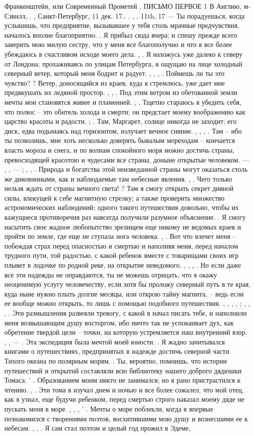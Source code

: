 Франкенштейн, или Современный Прометей , ПИСЬМО ПЕРВОЕ 1 В Англию, м- Сзвилл, . , Санкт-Петербург, 11 дек. 17.. . , . 11th, 17 — Ты порадуешься, когда услышишь, что предприятие, вызывавшее у тебя столь мрачные предчувствия, началось вполне благоприятно. . Я прибыл сюда вчера; и спешу прежде всего заверить мою милую сестру, что у меня все благополучно и что я все более убеждаюсь в счастливом исходе моего дела. , . Я нахожусь уже далеко к северу от Лондона; прохаживаясь по улицам Петербурга, я ощущаю на лице холодный северный ветер, который меня бодрит и радует. , , , . Поймешь ли ты это чувство? ? Ветер, доносящийся из краев, куда я стремлюсь, уже дает мне предвкушать их ледяной простор. , , . Под этим ветром из обетованной земли мечты мои становятся живее и пламенней. , . Тщетно стараюсь я убедить себя, что полюс – это обитель холода и смерти; он предстает моему воображению как царство красоты и радости. ; . Там, Маргарет, солнце никогда не заходит; его диск, едва подымаясь над горизонтом, излучает вечное сияние. , , , . Там – ибо ты позволишь, мне хоть несколько доверять бывалым мореходам – кончается власть мороза и снега, и по волнам спокойного моря можно достичь страны, превосходящей красотою и чудесами все страны, доныне открытые человеком. — , , — ; , , . Природа и богатства этой неизведанной страны могут оказаться столь же диковинными, как и наблюдаемые там небесные явления. , . Чего только нельзя ждать от страны вечного света! ? Там я смогу открыть секрет дивной силы, влекущей к себе магнитную стрелку; а также проверить множество астрономических наблюдений; одного такого путешествия довольно, чтобы их кажущиеся противоречия раз навсегда получили разумное объяснение. . Я смогу насытить свое жадное любопытство зрелищем еще никому не ведомых краев и пройти по земле, где еще не ступала нога человека. , . Вот что влечет меня – побеждая страх перед опасностью и смертью и наполняя меня, перед началом трудного пути, той радостью, с какой ребенок вместе с товарищами своих игр плывет в лодочке по родной реке, на открытие неведомого. , , , . Но если даже все эти надежды не оправдаются, ты не можешь отрицать, что я окажу неоценимую услугу человечеству, если хотя бы проложу северный путь в те края, куда ныне нужно плыть долгие месяцы, или открою тайну магнита, – ведь если ее вообще можно открыть, то лишь с помощью подобного путешествия. , , , , ; , , , . Эти размышления развеяли тревогу, с какой я начал писать тебе, и наполнили меня возвышающим душу восторгом, ибо ничто так не успокаивает дух, как обретение твердой цели – точки, на которую устремляется наш внутренний взор. , , — . Эта экспедиция была мечтой моей юности. . Я жадно зачитывался книгами о путешествиях, предпринятых в надежде достичь северной части Тихого океана по полярным морям. . Ты, вероятно, помнишь, что истории путешествий и открытий составляли всю библиотеку нашего доброго дядюшки Томаса. ' . Образованием моим никто не занимался; но я рано пристрастился к чтению. , . Эти тома я изучал днем и ночью и все более сожалел, что мой отец, как я узнал, еще будучи ребенком, перед смертью строго наказал моему дяде не пускать меня в море. , , , ' . Мечты о море поблекли, когда я впервые познакомился с творениями поэтов, восхитившими мою душу и вознесшими ее к небесам. , , . Я сам стал поэтом и целый год прожил в Эдеме, 